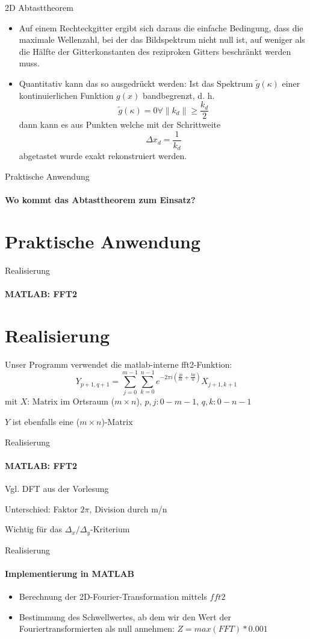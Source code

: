 \documentclass{beamer}
\begin{document}
	\begin{frame}{2D Abtasttheorem}
	\begin{itemize}
		\item Auf einem Rechteckgitter ergibt sich daraus die einfache Bedingung,	dass die maximale Wellenzahl, bei der das Bildspektrum nicht null ist,
		auf weniger als die Hälfte der Gitterkonstanten des reziproken Gitters beschränkt werden muss.
		\item Quantitativ kann das so ausgedrückt werden: Ist das Spektrum $\tilde{g}(\kappa)$ einer kontinuierlichen Funktion $g(x)$ bandbegrenzt, d. h.
		$$
		\tilde{g}(\kappa) = 0 \forall \left\|k_d\right\|\ge \frac{k_d}{2}
		$$
		dann kann es aus Punkten welche mit der Schrittweite
		$$
		\Delta x_d = \frac{1}{k_d}
		$$
		abgetastet wurde exakt rekonstruiert werden.
	\end{itemize}
	\end{frame}


	\begin{frame}{Praktische Anwendung}
	\framesubtitle{Wo kommt das Abtasttheorem zum Einsatz?}
	\section{Praktische Anwendung}
	\end{frame}
	
	\begin{frame}{Realisierung}
	\framesubtitle{MATLAB: FFT2}
	\section{Realisierung}	
	Unser Programm verwendet die matlab-interne fft2-Funktion:
	$$Y_{p+1,q+1} = \sum_{j=0}^{m-1}\sum_{k=0}^{n-1}e^{-2\pi i(\frac{jp}{m}+\frac{kq}{n})}X_{j+1,k+1}$$ mit $X$: Matrix im Ortsraum ($m\times n$), $p,j: 0 - m-1$, $q,k: 0 - n-1$

	$Y$ ist ebenfalls eine ($m\times n$)-Matrix
	\end{frame}
	\begin{frame}{Realisierung}
	\framesubtitle{MATLAB: FFT2}
	Vgl. DFT aus der Vorlesung
	
	Unterschied: Faktor $2\pi$, Division durch m/n
	
	Wichtig für das $\Delta_x / \Delta_y$-Kriterium
	\end{frame}
	
	\begin{frame}{Realisierung}
	\framesubtitle{Implementierung in MATLAB}
	\begin{itemize}
		\item Berechnung der 2D-Fourier-Transformation mittels $fft2$
		\item Bestimmung des \dq Schwellwertes\dq, ab dem wir den Wert der Fouriertransformierten als null annehmen: $Z = max(FFT)*0.001$	
	\end{itemize}

	\end{frame}
\end{document}

